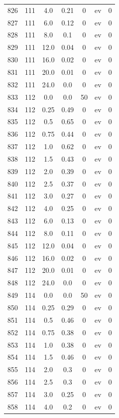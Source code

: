 \documentclass[12pt,a4paper]{article}
\begin{document}
\begin{tabular}{r|cccccc}
	826 & 111 & 4.0 & 0.21 & 0 & ev & 0 \\
	827 & 111 & 6.0 & 0.12 & 0 & ev & 0 \\
	828 & 111 & 8.0 & 0.1 & 0 & ev & 0 \\
	829 & 111 & 12.0 & 0.04 & 0 & ev & 0 \\
	830 & 111 & 16.0 & 0.02 & 0 & ev & 0 \\
	831 & 111 & 20.0 & 0.01 & 0 & ev & 0 \\
	832 & 111 & 24.0 & 0.0 & 0 & ev & 0 \\
	833 & 112 & 0.0 & 0.0 & 50 & ev & 0 \\
	834 & 112 & 0.25 & 0.49 & 0 & ev & 0 \\
	835 & 112 & 0.5 & 0.65 & 0 & ev & 0 \\
	836 & 112 & 0.75 & 0.44 & 0 & ev & 0 \\
	837 & 112 & 1.0 & 0.62 & 0 & ev & 0 \\
	838 & 112 & 1.5 & 0.43 & 0 & ev & 0 \\
	839 & 112 & 2.0 & 0.39 & 0 & ev & 0 \\
	840 & 112 & 2.5 & 0.37 & 0 & ev & 0 \\
	841 & 112 & 3.0 & 0.27 & 0 & ev & 0 \\
	842 & 112 & 4.0 & 0.25 & 0 & ev & 0 \\
	843 & 112 & 6.0 & 0.13 & 0 & ev & 0 \\
	844 & 112 & 8.0 & 0.11 & 0 & ev & 0 \\
	845 & 112 & 12.0 & 0.04 & 0 & ev & 0 \\
	846 & 112 & 16.0 & 0.02 & 0 & ev & 0 \\
	847 & 112 & 20.0 & 0.01 & 0 & ev & 0 \\
	848 & 112 & 24.0 & 0.0 & 0 & ev & 0 \\
	849 & 114 & 0.0 & 0.0 & 50 & ev & 0 \\
	850 & 114 & 0.25 & 0.29 & 0 & ev & 0 \\
	851 & 114 & 0.5 & 0.46 & 0 & ev & 0 \\
	852 & 114 & 0.75 & 0.38 & 0 & ev & 0 \\
	853 & 114 & 1.0 & 0.38 & 0 & ev & 0 \\
	854 & 114 & 1.5 & 0.46 & 0 & ev & 0 \\
	855 & 114 & 2.0 & 0.3 & 0 & ev & 0 \\
	856 & 114 & 2.5 & 0.3 & 0 & ev & 0 \\
	857 & 114 & 3.0 & 0.25 & 0 & ev & 0 \\
	858 & 114 & 4.0 & 0.2 & 0 & ev & 0 \\

\end{tabular}
\end{document}
